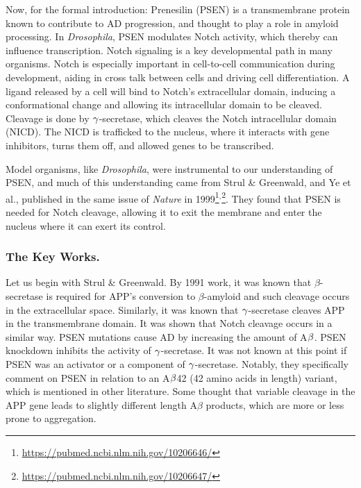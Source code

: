 Now, for the formal introduction: Prenesilin (PSEN) is a transmembrane protein known to contribute to AD progression, and thought to play a role in amyloid processing. In \textit{Drosophila}, PSEN modulates Notch activity, which thereby can influence transcription. Notch signaling is a key developmental path in many organisms. Notch is especially important in cell-to-cell communication during development, aiding in cross talk between cells and driving cell differentiation. A ligand released by a cell will bind to Notch's extracellular domain, inducing a conformational change and allowing its intracellular domain to be cleaved. Cleavage is done by $\gamma$-secretase, which cleaves the Notch intracellular domain (NICD). The NICD is trafficked to the nucleus, where it interacts with gene inhibitors, turns them off, and allowed genes to be transcribed.\newline

Model organisms, like \textit{Drosophila}, were instrumental to our understanding of PSEN, and much of this understanding came from Strul \& Greenwald, and Ye et al., published in the same issue of \textit{Nature} in 1999\footnote{\url{https://pubmed.ncbi.nlm.nih.gov/10206646/}}$^,$\footnote{\url{https://pubmed.ncbi.nlm.nih.gov/10206647/}}. They found that PSEN is needed for Notch cleavage, allowing it to exit the membrane and enter the nucleus where it can exert its control.

\subsubsection*{The Key Works.}

Let us begin with Strul \& Greenwald. By 1991 work, it was known that $\beta$-secretase is required for APP's conversion to $\beta$-amyloid and such cleavage occurs in the extracellular space. Similarly, it was known that $\gamma$-secretase cleaves APP in the transmembrane domain. It was shown that Notch cleavage occurs in a similar way. PSEN mutations cause AD by increasing the amount of A$\beta$. PSEN knockdown inhibits the activity of $\gamma$-secretase. It was not known at this point if PSEN was an activator or a component of $\gamma$-secretase. Notably, they specifically comment on PSEN in relation to an A$\beta$42 (42 amino acids in length) variant, which is mentioned in other literature. Some thought that variable cleavage in the APP gene leads to slightly different length A$\beta$ products, which are more or less prone to aggregation.\newline

